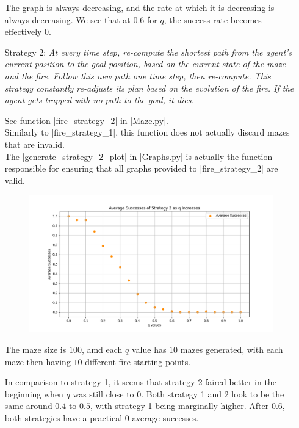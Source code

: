 \documentclass[12pt, twoside]{article}
\begin{document}
\begin{itemize}
        \vspace{4mm}
        The graph is always decreasing, and the rate at which it is decreasing is always decreasing. We see that at $0.6$ for $q$, the success rate becomes effectively $0$.

        \pagebreak
    
    \item[Strategy 2:]
        \textit{At every time step, re-compute the shortest path from the agent’s current position to the goal position, based on  the  current  state  of  the  maze  and  the  fire.   Follow  this  new  path  one  time  step,  then  re-compute.   This strategy constantly re-adjusts its plan based on the evolution of the fire.  If the agent gets trapped with no path to the goal, it dies.}

        \vspace{4mm}
        See function \cverb|fire_strategy_2| in \cverb|Maze.py|. \\
        Similarly to \cverb|fire_strategy_1|, this function does not actually discard mazes that are invalid. \\
        The \cverb|generate_strategy_2_plot| in \cverb|Graphs.py| is actually the function responsible for ensuring that all graphs provided to \cverb|fire_strategy_2| are valid.

        \begin{figure}[h]
            \centering
            \includegraphics[scale = 0.6]{strategy_2_scatter.png}
        \end{figure}

        The maze size is $100$, amd each $q$ value has $10$ mazes generated, with each maze then having $10$ different fire starting points.

        In comparison to strategy 1, it seems that strategy 2 faired better in the beginning when $q$ was still close to $0$. Both strategy 1 and 2 look to be the same around $0.4$ to $0.5$, with strategy 1 being marginally higher. After $0.6$, both strategies have a practical $0$ average successes.


\end{itemize}
\end{document}
